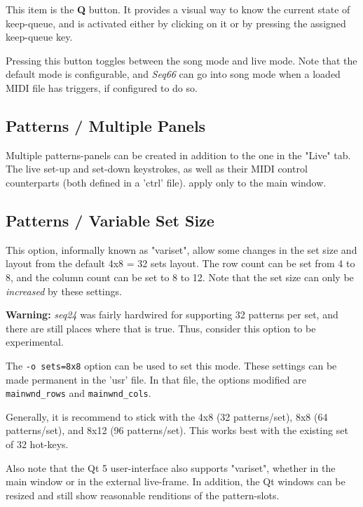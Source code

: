    This item is the \textbf{Q} button.
   It provides a visual way to know the current state of keep-queue, and is
   activated either by clicking on it or by pressing the assigned keep-queue
   key.

   Pressing this button toggles between the song mode and live mode.
   Note that the default mode is configurable, and \textsl{Seq66} can go into
   song mode when a loaded MIDI file has triggers, if configured to do so.

\subsection{Patterns / Multiple Panels}
\label{subsec:patterns_panel_multiple}

   Multiple patterns-panels can be created in addition to the one in the "Live"
   tab.  The live set-up and set-down keystrokes, as well as their MIDI control
   counterparts (both defined in a 'ctrl' file).
   apply only to the main window.

\subsection{Patterns / Variable Set Size}
\label{subsec:patterns_panel_variset}

   This option, informally known as "variset", allow some changes in
   the set size and layout from the default 4x8 = 32 sets layout.
   The row count can be set from 4 to 8, and the column count can be set to 8
   to 12.  Note that the set size can only be \textsl{increased} by these
   settings.

   \textbf{Warning:}
   \textsl{seq24} was fairly hardwired for supporting 32 patterns per
   set, and there are still places where that is true.  Thus,
   consider this option to be experimental.

   The \texttt{-o sets=8x8} option can be used to set this mode.
   These settings can be made permanent in the 'usr' file.
   In that file, the options modified are \texttt{mainwnd\_rows} and
   \texttt{mainwnd\_cols}.

   Generally, it is recommend to stick with the 4x8 (32 patterns/set),
   8x8 (64 patterns/set), and 8x12 (96 patterns/set).  This works best with the
   existing set of 32 hot-keys.

   Also note that the Qt 5 user-interface also supports "variset", whether in
   the main window or in the external live-frame.  In addition, the Qt windows
   can be resized and still show reasonable renditions of the pattern-slots.

